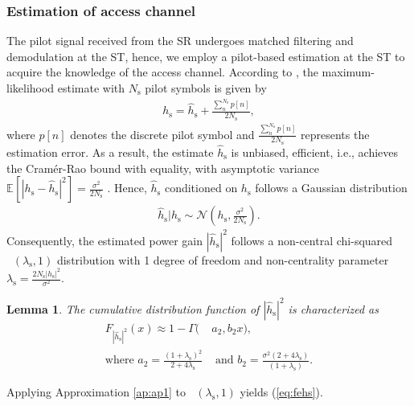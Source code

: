 \documentclass[12pt, draftclsnofoot, onecolumn]{IEEEtran}
\newcommand{\e}[2]{{\mathbb E}_{#1}\left[ #2 \right]}
\newcommand{\p}{\mathbb P}
\newcommand{\sub}[1]{_{\text{#1}}}
\newcommand{\op}{\text{P}\sub{out}}
\newcommand{\opc}{\rho\sub{out}}
\newcommand{\preg}{P\sub{cont}}
\newcommand{\pp}{P\sub{p}}
\newcommand{\ite}{\theta\sub{I}}
\newcommand{\gp}{h\sub{p}}
\newcommand{\epgs}{|\hat{h}\sub{s}|^2}
\newcommand{\gs}{h\sub{s}}
\newcommand{\egs}{\hat{h}\sub{s}}
\newcommand{\nps}{\sigma^2}
\newcommand{\fgs}{F_{\epgs}}
\newcommand{\ls}{\lambda\sub{s}}
\newcommand{\Ks}{N\sub{s}}
\DeclareMathOperator*{\ncchi}{\mathcal{X}_1^2}
\newtheorem{lemma}{Lemma}
\begin{document}
\subsubsection{Estimation of access channel}
The pilot signal received from the SR undergoes matched filtering and demodulation at the ST, hence, we employ a pilot-based estimation at the ST to acquire the knowledge of the access channel. According to \cite{Gifford08}, the maximum-likelihood estimate with $\Ks$ pilot symbols is given by 
\begin{align}
\gs = \egs + \frac{\sum^{\Ks}_{n} p[n]}{2 \Ks},
\label{eq:pilot_MLE}
\end{align}
where $p[n]$ denotes the discrete pilot symbol and $\frac{\sum^{\Ks}_{n} p[n]}{2 \Ks}$ represents the estimation error.
As a result, the estimate $\egs$ is unbiased, efficient, i.e., achieves the Cram\'er-Rao bound with equality, with asymptotic variance $\e{}{|\gs -\egs|^2} = \frac{\nps}{2 \Ks}$ \cite{Gifford08}. Hence, $\egs$ conditioned on $\gs$ follows a Gaussian distribution
\begin{align}
\egs|\gs \sim \mathcal{N}\left( \gs,\frac{\nps}{2 \Ks} \right).
\label{eq:ehs} 
\end{align}
Consequently, the estimated power gain $|\egs|^2$ follows a non-central chi-squared $\ncchi(\ls, 1)$ distribution with 1 degree of freedom and non-centrality parameter $\ls = \frac{2 \Ks |\gs|^2}{\nps}$. 
\begin{lemma} \label{lm:lm2}
The cumulative distribution function of $\epgs$ is characterized as 
\begin{align}
\fgs(x) \approx 1 - \Gamma(&a_2, b_2 x) \label{eq:fehs},\\ 
\text{where  } a_2 = \frac{(1 + \ls)^2}{2 + 4 \ls} &\text{ and } b_2 = \frac{\nps (2 + 4 \ls)}{(1 + \ls)}.  \nonumber 
\end{align} 
\end{lemma}
\begin{IEEEproof}
Applying Approximation \ref{ap:ap1} to $\ncchi(\ls,1 )$ yields (\ref{eq:fehs}). 
\end{IEEEproof}
\end{document}
